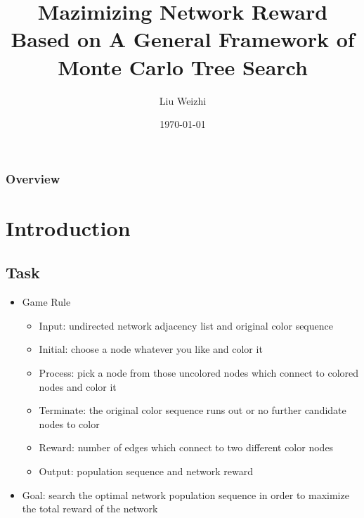 \documentclass[compress]{beamer}
\title[CS5330 Project]{Mazimizing Network Reward \\ Based on A General Framework of \\ Monte Carlo Tree Search} %
\author{Liu Weizhi} %
\institute[NUS - ISE] %
{
Department of Industrial \& Systems Engineering \\ National University of Singapore \\ %
\medskip
\textit{weizhiliu2009@gmail.com} %
}
\date{\today} %
\begin{document}
\small

\begin{frame}
\titlepage %
\end{frame}

\begin{frame}
\frametitle{Overview} %
\tableofcontents %
\end{frame}

\section{Introduction}
\subsection{Task}
\begin{frame}
              \begin{itemize}
                \item Game Rule
                   \begin{itemize}
                     \item Input: undirected network adjacency list and original color sequence
                     \item Initial: choose a node whatever you like and color it
                     \item Process: pick a node from those uncolored nodes which connect to colored nodes and color it 
                     \item Terminate: the original color sequence runs out or no further candidate nodes to color
                     \item Reward: number of edges which connect to two different color nodes
                     \item Output: population sequence and network reward                       
                   \end{itemize}
                \item Goal: search the optimal network population sequence in order to maximize the total reward of the network
              \end{itemize}
\end{frame}
\end{document}
